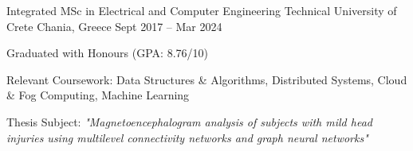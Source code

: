 

\begin{cventries}

  \cventry
    {Integrated MSc in Electrical and Computer Engineering} %
    {Technical University of Crete} %
    {Chania, Greece} %
    {Sept 2017 -- Mar 2024} %
    {
      \begin{cvitems} %
        \item {Graduated with Honours (GPA: 8.76/10)}
        \item Relevant Coursework: Data Structures \& Algorithms, Distributed Systems, Cloud \& Fog Computing, Machine Learning
        \item {Thesis Subject: \textit{"Magnetoencephalogram analysis of subjects with mild head injuries using multilevel connectivity networks and graph neural networks"}}
      \end{cvitems}
    }
    
\end{cventries}
